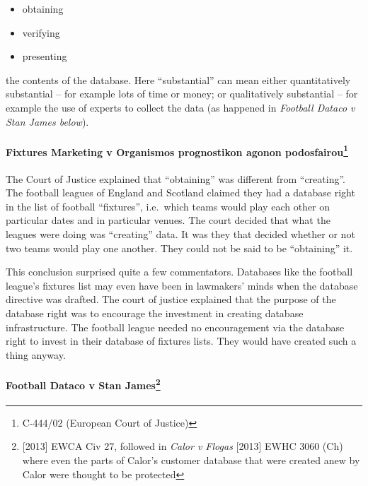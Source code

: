\begin{itemize}
\item
  obtaining
\item
  verifying
\item
  presenting
\end{itemize}

the contents of the database. Here ``substantial'' can mean either
quantitatively substantial -- for example lots of time or money; or
qualitatively substantial -- for example the use of experts to collect
the data (as happened in \emph{Football Dataco v Stan James below}).

\paragraph[Fixtures Marketing v Organismos prognostikon agonon
podosfairou]{Fixtures Marketing v Organismos prognostikon agonon
podosfairou\footnote{C-444/02 (European Court of Justice)}}\label{fixtures-marketing-v-organismos-prognostikon-agonon-podosfairou8}

The Court of Justice explained that ``obtaining'' was different from
``creating''. The football leagues of England and Scotland claimed they
had a database right in the list of football ``fixtures'', i.e.~which
teams would play each other on particular dates and in particular
venues. The court decided that what the leagues were doing was
``creating'' data. It was they that decided whether or not two teams
would play one another. They could not be said to be ``obtaining'' it.

This conclusion surprised quite a few commentators. Databases like the
football league's fixtures list may even have been in lawmakers' minds
when the database directive was drafted. The court of justice explained
that the purpose of the database right was to encourage the investment
in creating database infrastructure. The football league needed no
encouragement via the database right to invest in their database of
fixtures lists. They would have created such a thing anyway.

\paragraph[Football Dataco v Stan James]{Football Dataco v Stan
James\footnote{{[}2013{]} EWCA Civ 27, followed in \emph{Calor v Flogas}
  {[}2013{]} EWHC 3060 (Ch) where even the parts of Calor's customer
  database that were created anew by Calor were thought to be protected}}\label{football-dataco-v-stan-james9}

